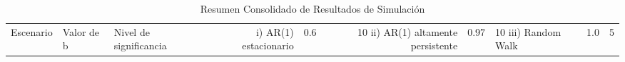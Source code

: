 \begin{table}
\caption{Resumen Consolidado de Resultados de Simulación}
\label{tab:resumen_final}
\begin{tabular}{lllrrrr}
\toprule
Escenario & Valor de b & Nivel de significancia & %
\midrule
i) AR(1) estacionario & 0.6 & 10%
ii) AR(1) altamente persistente & 0.97 & 10%
iii) Random Walk & 1.0 & 5%
\bottomrule
\end{tabular}
\end{table}
